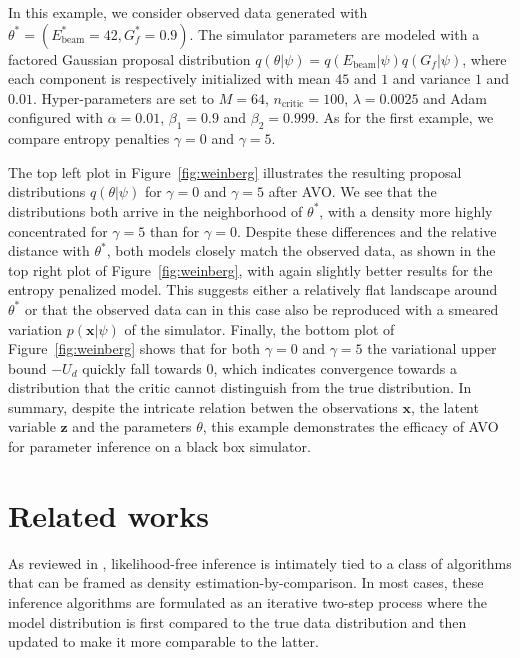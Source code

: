 \documentclass[twocolumn,superscriptaddress,aps]{revtex4-1}
\theoremstyle{plain}
\begin{document}
In this example, we consider observed data generated with $\theta^* =
(E_\text{beam}^*=42, G_f^*=0.9)$. The simulator parameters are modeled with a
factored Gaussian proposal distribution $q(\theta|\psi) = q(E_\text{beam}|\psi)
q(G_f|\psi)$, where each component is respectively initialized with mean $45$
and $1$ and variance $1$ and $0.01$. Hyper-parameters are set to $M=64$,
$n_\text{critic}=100$, $\lambda=0.0025$ and Adam configured with $\alpha=0.01$,
$\beta_1=0.9$ and $\beta_2=0.999$. As for the first example, we compare
entropy penalties $\gamma=0$ and $\gamma=5$.

The top left plot in Figure~\ref{fig:weinberg} illustrates the resulting
proposal distributions $q(\theta|\psi)$ for $\gamma=0$ and $\gamma=5$ after
AVO. We see that the distributions both arrive
in the neighborhood of $\theta^*$, with a density  more highly concentrated for
$\gamma=5$ than for $\gamma=0$.  Despite these differences and the relative
distance with $\theta^*$, both models closely match the observed data, as shown
in the top right plot of  Figure~\ref{fig:weinberg}, with again slightly better
results for the entropy penalized model. This suggests either a relatively flat
landscape around $\theta^*$ or that the observed data can in this case also be
reproduced with a smeared variation $p(\mathbf{x}|\psi)$ of the simulator.
Finally, the bottom plot of Figure~\ref{fig:weinberg} shows that for both
$\gamma=0$ and $\gamma=5$ the variational upper bound $-U_d$ quickly fall
towards $0$, which indicates  convergence towards a distribution that the critic
cannot distinguish from the true distribution. In summary, despite the intricate
relation betwen the observations $\mathbf{x}$, the latent variable $\mathbf{z}$
and the parameters $\theta$, this example demonstrates the efficacy
of AVO for parameter inference on a black box
simulator.




\section{Related works}

As reviewed in \cite{2016arXiv161003483M}, likelihood-free inference is
intimately tied to a class of algorithms that can be framed as density
estimation-by-comparison. In most cases, these inference algorithms are
formulated as an iterative two-step process where the model distribution is
first compared to the true data distribution and then updated to make it more
comparable to the latter.
\end{document}
